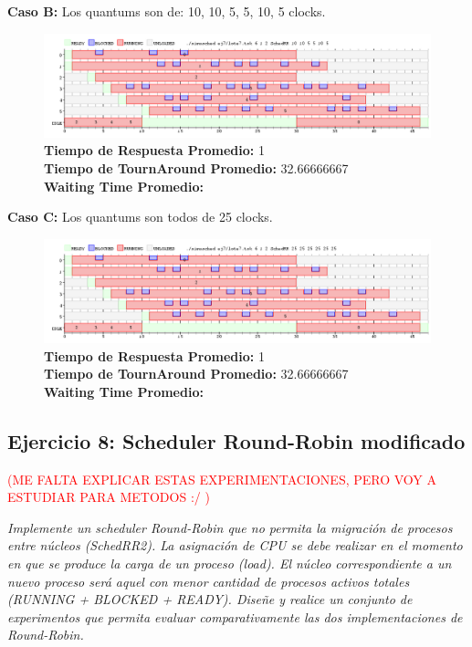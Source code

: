 \documentclass[a4paper]{article}
\begin{document}
	\textbf{Caso B:}  Los quantums son de: 10, 10, 5, 5, 10, 5 clocks.
	
			 \begin{figure}[h!]
   \begin{center}
 	\includegraphics[scale=0.5]{imagenes/ej7/6nucleoB.png}
 	\textbf{Tiempo de Respuesta Promedio:} 1 \\
 	\textbf{Tiempo de TournAround Promedio:} 32.66666667 \\
 	\textbf{Waiting Time Promedio:} \\
   \end{center}
 \end{figure} 
 
	\textbf{Caso C:}  Los quantums son todos de 25 clocks.
	
		 \begin{figure}[h!]
   \begin{center}
 	\includegraphics[scale=0.5]{imagenes/ej7/6nucleoC.png}
 	\textbf{Tiempo de Respuesta Promedio:} 1 \\
 	\textbf{Tiempo de TournAround Promedio:} 32.66666667 \\
 	\textbf{Waiting Time Promedio:} \\
   \end{center}
 \end{figure} 

\newpage
 \subsection{Ejercicio 8: Scheduler Round-Robin modificado}
 
\textcolor{red}{(ME FALTA EXPLICAR ESTAS EXPERIMENTACIONES, PERO VOY A ESTUDIAR PARA METODOS :/ )} 
 
\textit{Implemente un scheduler Round-Robin que no permita la migraci\'on de procesos entre n\'ucleos (SchedRR2). La asignaci\'on de CPU se debe realizar en el momento en que se produce la carga de un proceso (load). El n\'ucleo correspondiente a un nuevo proceso ser\'a aquel con menor cantidad de procesos activos totales (RUNNING + BLOCKED + READY). Dise\~ne y realice un conjunto de experimentos que permita evaluar comparativamente las dos implementaciones de Round-Robin.}
\end{document}
